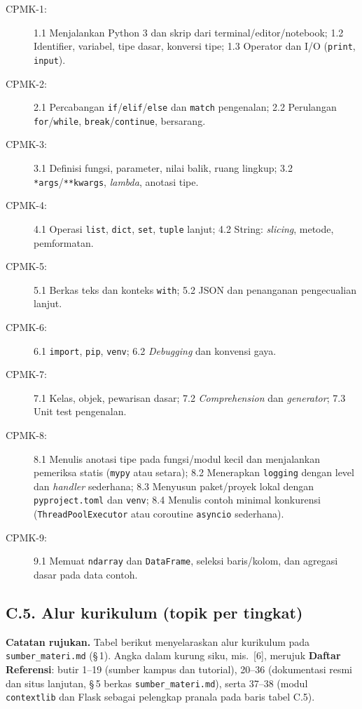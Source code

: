 \documentclass[12pt,a4paper]{article}
\begin{document}
\begin{description}
  \item[CPMK-1:] 1.1 Menjalankan Python 3 dan skrip dari terminal/editor/notebook; 1.2 Identifier, variabel, tipe dasar, konversi tipe; 1.3 Operator dan I/O (\texttt{print}, \texttt{input}).
  \item[CPMK-2:] 2.1 Percabangan \texttt{if}/\texttt{elif}/\texttt{else} dan \texttt{match} pengenalan; 2.2 Perulangan \texttt{for}/\texttt{while}, \texttt{break}/\texttt{continue}, bersarang.
  \item[CPMK-3:] 3.1 Definisi fungsi, parameter, nilai balik, ruang lingkup; 3.2 \texttt{*args}/\texttt{**kwargs}, \textit{lambda}, anotasi tipe.
  \item[CPMK-4:] 4.1 Operasi \texttt{list}, \texttt{dict}, \texttt{set}, \texttt{tuple} lanjut; 4.2 String: \textit{slicing}, metode, pemformatan.
  \item[CPMK-5:] 5.1 Berkas teks dan konteks \texttt{with}; 5.2 JSON dan penanganan pengecualian lanjut.
  \item[CPMK-6:] 6.1 \texttt{import}, \texttt{pip}, \texttt{venv}; 6.2 \textit{Debugging} dan konvensi gaya.
  \item[CPMK-7:] 7.1 Kelas, objek, pewarisan dasar; 7.2 \textit{Comprehension} dan \textit{generator}; 7.3 Unit test pengenalan.
  \item[CPMK-8:] 8.1 Menulis anotasi tipe pada fungsi/modul kecil dan menjalankan pemeriksa statis (\texttt{mypy} atau setara); 8.2 Menerapkan \texttt{logging} dengan level dan \textit{handler} sederhana; 8.3 Menyusun paket/proyek lokal dengan \texttt{pyproject.toml} dan \texttt{venv}; 8.4 Menulis contoh minimal konkurensi (\texttt{ThreadPoolExecutor} atau coroutine \texttt{asyncio} sederhana).
  \item[CPMK-9:] 9.1 Memuat \texttt{ndarray} dan \texttt{DataFrame}, seleksi baris/kolom, dan agregasi dasar pada data contoh.
\end{description}

\subsection*{C.5. Alur kurikulum (topik per tingkat)}

\noindent\textbf{Catatan rujukan.} Tabel berikut menyelaraskan alur kurikulum pada \texttt{sumber\_materi.md} (§\,1). Angka dalam kurung siku, mis.\ [6], merujuk \textbf{Daftar Referensi}: butir 1--19 (sumber kampus dan tutorial), 20--36 (dokumentasi resmi dan situs lanjutan, §\,5 berkas \texttt{sumber\_materi.md}), serta 37--38 (modul \texttt{contextlib} dan Flask sebagai pelengkap pranala pada baris tabel C.5).
\end{document}
